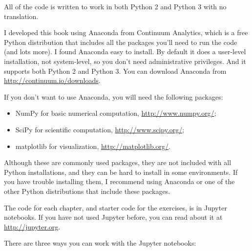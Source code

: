 \documentclass[12pt]{book}
\theoremstyle{exercise}
\begin{document}
All of the code is written to work in both Python 2 and Python 3
with no translation.

I developed this book using Anaconda from
Continuum Analytics, which is a free Python distribution that includes
all the packages you'll need to run the code (and lots more).
I found Anaconda easy to install.  By default it does a user-level
installation, not system-level, so you don't need administrative
privileges.  And it supports both Python 2 and Python 3.  You can
download Anaconda from \url{http://continuum.io/downloads}.

If you don't want to use Anaconda, you will need the following
packages:

\begin{itemize}

\item NumPy for basic numerical computation, \url{http://www.numpy.org/};

\item SciPy for scientific computation,
  \url{http://www.scipy.org/};

\item matplotlib for visualization, \url{http://matplotlib.org/}.


\end{itemize}

Although these are commonly used packages, they are not included with
all Python installations, and they can be hard to install in some
environments.  If you have trouble installing them, I
recommend using Anaconda or one of the other Python distributions
that include these packages.

The code for each chapter, and starter code for the exercises, is in
Jupyter notebooks.  If you have not used Jupyter before, you can read
about it at \url{http://jupyter.org}.  

There are three ways you can work with the Jupyter notebooks:
\end{document}
